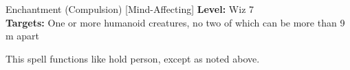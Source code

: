 {Enchantment (Compulsion) [Mind-Affecting]}
{
	\textbf{Level:}
	Wiz 7\\
	\textbf{Targets:}
	One or more humanoid creatures, no two of which can be more than 9 m apart\\
}
{
	This spell functions like hold person, except as noted above.

}
